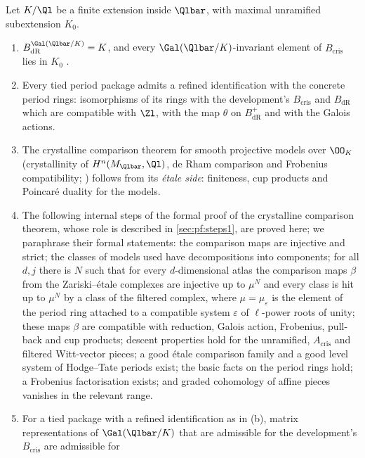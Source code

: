 \begin{proposition}\label{prop:pf:steps2:padicfound}
Let $K/\Ql$ be a finite extension inside $\Qlbar$, with maximal unramified subextension $K_0$.
\begin{enumerate}[label=\textup{(\alph*)},leftmargin=2.2em]
\item $B_{\mathrm{dR}}^{\Gal(\Qlbar/K)}=K$, and every $\Gal(\Qlbar/K)$-invariant element of
  $B_{\mathrm{cris}}$ lies in $K_0$ \cite{Fontaine1994}.
\item Every tied period package admits a refined identification with the concrete period rings:
  isomorphisms of its rings with the development's $B_{\mathrm{cris}}$ and $B_{\mathrm{dR}}$ which are
  compatible with $\Zl$, with the map $\theta$ on $B^+_{\mathrm{dR}}$ and with the Galois actions.
\item The crystalline comparison theorem for smooth projective models over $\OO_K$ (crystallinity of
  $H^n(M_{\Qlbar},\Ql)$, de Rham comparison and Frobenius compatibility;
  \cite{FontaineMessing1987,Faltings1989,Tsuji1999,BhattMorrowScholze2018}) follows from its
  \emph{\'etale side}: finiteness, cup products and Poincar\'e duality for the models.
\item The following internal steps of the formal proof of the crystalline comparison theorem, whose
  role is described in \cref{sec:pf:steps1}, are proved here; we paraphrase their formal statements:
  the comparison maps are injective and strict; the classes of models used have decompositions into
  components; for all $d,j$ there is $N$ such that for every $d$-dimensional atlas the comparison maps
  $\beta$ from the Zariski--\'etale complexes are injective up to $\mu^N$ and every class is hit up to
  $\mu^N$ by a class of the filtered complex, where $\mu=\mu_\varepsilon$ is the element of the period ring attached to a compatible system $\varepsilon$ of $\ell$-power roots of unity; these
  maps $\beta$ are compatible with reduction, Galois action, Frobenius, pull-back and cup products;
  descent properties hold for the unramified, $A_{\mathrm{cris}}$ and filtered Witt-vector pieces; a
  good \'etale comparison family and a good level system of Hodge--Tate periods exist; the basic facts
  on the period rings hold; a Frobenius factorisation exists; and graded cohomology of affine pieces
  vanishes in the relevant range.
\item For a tied package with a refined identification as in (b), matrix representations of
  $\Gal(\Qlbar/K)$ that are admissible for the development's $B_{\mathrm{cris}}$ are admissible for

\end{enumerate}
\end{proposition}
